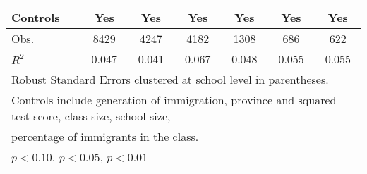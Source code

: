 \begin{table}[htbp]
\begin{tabular}{l*{6}{c}}
Controls            &         Yes         &         Yes         &         Yes         &         Yes         &         Yes         &         Yes         \\
\midrule
Obs.                &        8429         &        4247         &        4182         &        1308         &         686         &         622         \\
\(R^{2}\)           &       0.047         &       0.041         &       0.067         &       0.048         &       0.055         &       0.055         \\
\bottomrule
\multicolumn{7}{l}{\footnotesize Robust Standard Errors clustered at school level in parentheses.}\\
\multicolumn{7}{l}{\footnotesize Controls include generation of immigration, province and squared test score, class size, school size,}\\
\multicolumn{7}{l}{\footnotesize percentage of immigrants in the class.}\\
\multicolumn{7}{l}{\footnotesize \sym{*} \(p<0.10\), \sym{**} \(p<0.05\), \sym{***} \(p<0.01\)}\\
\end{tabular}
\end{table}
